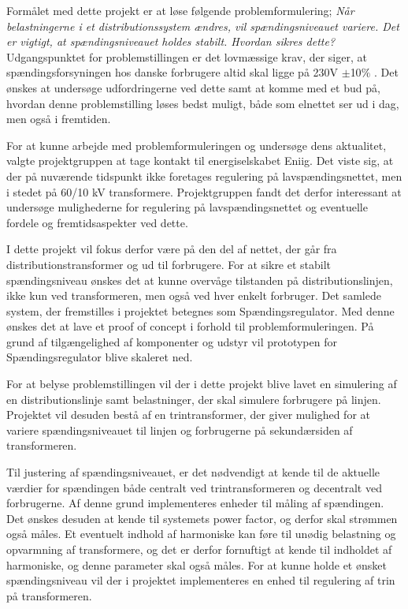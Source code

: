 
Formålet med dette projekt er at løse følgende problemformulering; \textit{Når belastningerne i et distributionssystem ændres, vil spændingsniveauet variere. Det er vigtigt, at spændingsniveauet holdes stabilt. Hvordan sikres dette?}
Udgangspunktet for problemstillingen er det lovmæssige krav, der siger, at spændingsforsyningen hos danske forbrugere altid skal ligge på 230V $\pm$10$\%$ \cite{Sikkerhedsstyrelsen}. Det ønskes at undersøge udfordringerne ved dette samt at komme med et bud på, hvordan denne problemstilling løses bedst muligt, både som elnettet ser ud i dag, men også i fremtiden. 

For at kunne arbejde med problemformuleringen og undersøge dens aktualitet, valgte projektgruppen at tage kontakt til energiselskabet Eniig. Det viste sig, at der på nuværende tidspunkt ikke foretages regulering på lavspændingsnettet, men i stedet på 60/10 kV transformere. Projektgruppen fandt det derfor interessant at undersøge mulighederne for regulering på lavspændingsnettet og eventuelle fordele og fremtidsaspekter ved dette.

I dette projekt vil fokus derfor være på den del af nettet, der går fra distributionstransformer og ud til forbrugere. For at sikre et stabilt spændingsniveau ønskes det at kunne overvåge tilstanden på distributionslinjen, ikke kun ved transformeren, men også ved hver enkelt forbruger. Det samlede system, der fremstilles i projektet betegnes som Spændingsregulator. Med denne ønskes det at lave et proof of concept i forhold til problemformuleringen. På grund af tilgængelighed af komponenter og udstyr vil prototypen for Spændingsregulator blive skaleret ned. 

For at belyse problemstillingen vil der i dette projekt blive lavet en simulering af en distributionslinje samt belastninger, der skal simulere forbrugere på linjen. Projektet vil desuden bestå af en trintransformer, der giver mulighed for at variere spændingsniveauet til linjen og forbrugerne på sekundærsiden af transformeren.

Til justering af spændingsniveauet, er det nødvendigt at kende til de aktuelle værdier for spændingen både centralt ved trintransformeren og decentralt ved forbrugerne. Af denne grund implementeres enheder til måling af spændingen. Det ønskes desuden at kende til systemets power factor, og derfor skal strømmen også måles. Et eventuelt indhold af harmoniske kan føre til unødig belastning og opvarmning af transformere, og det er derfor fornuftigt at kende til indholdet af harmoniske, og denne parameter skal også måles.
For at kunne holde et ønsket spændingsniveau vil der i projektet implementeres en enhed til regulering af trin på transformeren.

